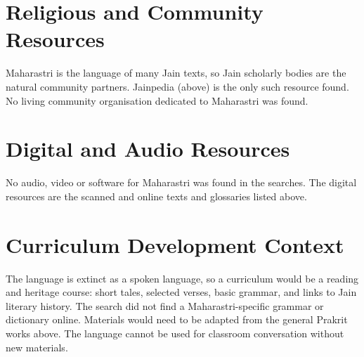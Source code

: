 \documentclass[12pt]{article}
\begin{document}
\section{Religious and Community Resources}
Maharastri is the language of many Jain texts, so Jain scholarly bodies are the natural community partners. Jainpedia (above) is the only such resource found. No living community organisation dedicated to Maharastri was found.

\section{Digital and Audio Resources}
No audio, video or software for Maharastri was found in the searches. The digital resources are the scanned and online texts and glossaries listed above.

\section{Curriculum Development Context}
The language is extinct as a spoken language, so a curriculum would be a reading and heritage course: short tales, selected verses, basic grammar, and links to Jain literary history. The search did not find a Maharastri-specific grammar or dictionary online. Materials would need to be adapted from the general Prakrit works above. The language cannot be used for classroom conversation without new materials.
\end{document}

